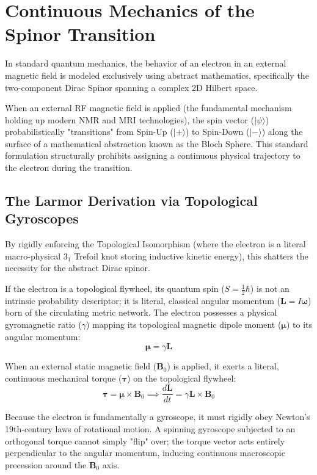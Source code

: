 \section{Continuous Mechanics of the Spinor Transition}

In standard quantum mechanics, the behavior of an electron in an external magnetic field is modeled exclusively using abstract mathematics, specifically the two-component Dirac Spinor spanning a complex 2D Hilbert space. 

When an external RF magnetic field is applied (the fundamental mechanism holding up modern NMR and MRI technologies), the spin vector ($| \psi \rangle$) probabilistically "transitions" from Spin-Up ($|+\rangle$) to Spin-Down ($|-\rangle$) along the surface of a mathematical abstraction known as the Bloch Sphere. This standard formulation structurally prohibits assigning a continuous physical trajectory to the electron during the transition.

\subsection{The Larmor Derivation via Topological Gyroscopes}
By rigidly enforcing the Topological Isomorphism (where the electron is a literal macro-physical $3_1$ Trefoil knot storing inductive kinetic energy), this shatters the necessity for the abstract Dirac spinor. 

If the electron is a topological flywheel, its quantum spin ($S = \frac{1}{2}\hbar$) is not an intrinsic probability descriptor; it is literal, classical angular momentum ($\mathbf{L} = I\boldsymbol{\omega}$) born of the circulating metric network. The electron possesses a physical gyromagnetic ratio ($\gamma$) mapping its topological magnetic dipole moment ($\boldsymbol{\mu}$) to its angular momentum:
\begin{equation}
    \boldsymbol{\mu} = \gamma \mathbf{L}
\end{equation}

When an external static magnetic field ($\mathbf{B}_0$) is applied, it exerts a literal, continuous mechanical torque ($\boldsymbol{\tau}$) on the topological flywheel:
\begin{equation}
    \boldsymbol{\tau} = \boldsymbol{\mu} \times \mathbf{B}_0 \implies \frac{d\mathbf{L}}{dt} = \gamma \mathbf{L} \times \mathbf{B}_0
\end{equation}

Because the electron is fundamentally a gyroscope, it must rigidly obey Newton's 19th-century laws of rotational motion. A spinning gyroscope subjected to an orthogonal torque cannot simply "flip" over; the torque vector acts entirely perpendicular to the angular momentum, inducing continuous macroscopic precession around the $\mathbf{B}_0$ axis.


